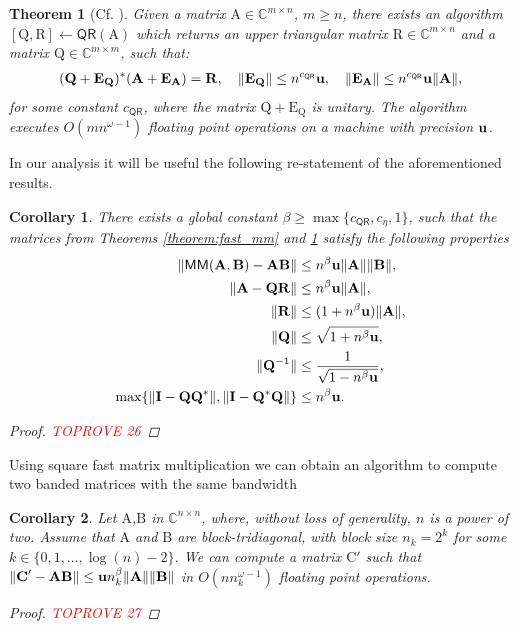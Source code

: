 \documentclass{article}
\newcommand{\lnorm}{\left\|}
\newcommand{\rnorm}{\right\|}
\newtheorem{theorem}{Theorem}[section]
\newtheorem{corollary}{Corollary}[section]
\newcommand\matA{\boldsymbol{\mathrm{A}}}
\newcommand\matB{\boldsymbol{\mathrm{B}}}
\newcommand\matC{\boldsymbol{\mathrm{C}}}
\newcommand\matE{\boldsymbol{\mathrm{E}}}
\newcommand\matI{\boldsymbol{\mathrm{I}}}
\newcommand\matQ{\boldsymbol{\mathrm{Q}}}
\newcommand\matR{\boldsymbol{\mathrm{R}}}
\newcommand{\umach}{\textbf{\textup{u}}}
\newcommand{\QR}{\mathsf{QR}}
\newcommand{\MM}{\mathsf{MM}}
\newcommand{\cmm}{\beta}
\begin{document}
\begin{theorem}[Cf. \cite{demmel2007fastla}]
\label{theorem:alg_qr}
Given a matrix $\matA\in\mathbb{C}^{m\times n}$, $m\geq n$, there exists an algorithm $[\matQ,\matR]\leftarrow\QR(\matA)$ which returns an upper triangular matrix $\matR\in\mathbb{C}^{m\times n}$ and a matrix $\matQ\in\mathbb{C}^{m\times m}$, such that:
\begin{align*}
    (\matQ+\matE_{\matQ})^*(\matA+\matE_{\matA}) = \matR, 
    \quad
    \|\matE_{\matQ}\|\leq n^{c_{\QR}}\umach,
    \quad
    \|\matE_{\matA}\|\leq n^{c_{\QR}}\umach\|\matA\|,
\end{align*}
for some constant $c_{\QR}$, where the matrix $\matQ+\matE_{\matQ}$ is unitary. The algorithm executes $O(mn^{\omega-1})$ floating point operations on a machine with precision $\umach$.
\end{theorem}
In our analysis it will be useful the following re-statement of the aforementioned results.
\begin{corollary}
\label{corollary:alg_qr}
There exists a global constant $\cmm\geq \max\{c_{\QR},c_{\eta},1\}$, such that the matrices from Theorems \ref{theorem:fast_mm} and \ref{theorem:alg_qr} satisfy the following properties
    \begin{align*}
        \lnorm  \MM(\matA,\matB)-\matA\matB \rnorm &\leq n^{\cmm} \umach \|\matA\|\|\matB\|,
        \\
        \lnorm \matA - \matQ\matR \rnorm &\leq  n^{\cmm}\umach\|\matA\|, 
        \\
        \|\matR\|&\leq (1+n^{\cmm}\umach)\|\matA\|,
        \\
        \|\matQ\|&\leq \sqrt{1+n^{\cmm}\umach},
        \\
        \|\matQ^{-1}\|&\leq \frac{1}{\sqrt{1-n^{\cmm}\umach}},
        \\
        \max\{
            \|\matI-\matQ\matQ^*\|,\|\matI-\matQ^*\matQ\|
        \}
        &\leq
        n^{\cmm}\umach.
    \end{align*}
\begin{proof}\textcolor{red}{TOPROVE 26}\end{proof}
\end{corollary}

Using square fast matrix multiplication we can obtain an algorithm to compute two banded matrices with the same bandwidth
\begin{corollary}
    \label{corollary:block_tridiagonal_mm}
    Let $\matA$,$\matB$ in $\mathbb{C}^{n\times n}$, where, without loss of generality, $n$ is a power of two. Assume that $\matA$ and $\matB$ are block-tridiagonal, with block size $n_k=2^k$ for some $k\in \{0,1,\ldots,\log(n)-2\}$. We can compute a matrix $\matC'$ such that $\|\matC'-\matA\matB\|\leq \umach n_k^{\beta}\|\matA\|\|\matB\|$ in $O(nn_k^{\omega-1})$ floating point operations.
    \begin{proof}\textcolor{red}{TOPROVE 27}\end{proof}
\end{corollary}
\end{document}
